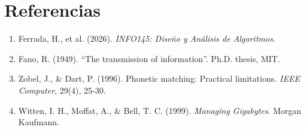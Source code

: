 \documentclass[11pt, twocolumn]{article}
\begin{document}
\section*{Referencias}

\begin{enumerate}
    \item Ferrada, H., et al. (2026). \textit{INFO145: Diseño y Análisis de Algoritmos}.
    \item Fano, R. (1949). ``The transmission of information''. Ph.D. thesis, MIT.
    \item Zobel, J., \& Dart, P. (1996). Phonetic matching: Practical limitations. \textit{IEEE Computer}, 29(4), 25-30.
    \item Witten, I. H., Moffat, A., \& Bell, T. C. (1999). \textit{Managing Gigabytes}. Morgan Kaufmann.
\end{enumerate}
\end{document}
